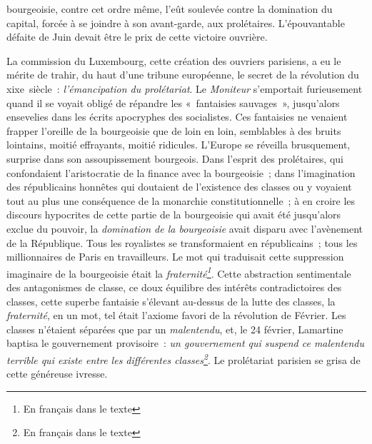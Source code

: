 \documentclass[twoside]{book} %
\begin{document}
bourgeoisie, contre cet ordre même, l’eût soulevée contre la domination du capital, forcée à se joindre à son avant-garde, aux prolétaires. L’épouvantable défaite de Juin devait être le prix de cette victoire ouvrière.\par
La commission du Luxembourg, cette création des ouvriers parisiens, a eu le mérite de trahir, du haut d’une tribune européenne, le secret de la révolution du xixe siècle : \emph{l’émancipation du prolétariat}. Le \emph{Moniteur} s’emportait furieusement quand il se voyait obligé de répandre les « fantaisies sauvages », jusqu’alors ensevelies dans les écrits apocryphes des socialistes. Ces fantaisies ne venaient frapper l’oreille de la bourgeoisie que de loin en loin, semblables à des bruits lointains, moitié effrayants, moitié ridicules. L’Europe se réveilla brusquement, surprise dans son assoupissement bourgeois. Dans l’esprit des prolétaires, qui confondaient l’aristocratie de la finance avec la bourgeoisie ; dans l’imagination des républicains honnêtes qui doutaient de l’existence des classes ou y voyaient tout au plus une conséquence de la monarchie constitutionnelle ; à en croire les discours hypocrites de cette partie de la bourgeoisie qui avait été jusqu’alors exclue du pouvoir, la \emph{domination de la bourgeoisie} avait disparu avec l’avènement de la République. Tous les royalistes se transformaient en républicains ; tous les millionnaires de Paris en travailleurs. Le mot qui traduisait cette suppression imaginaire de la bourgeoisie était la \emph{fraternité\footnote{En français dans le texte}}. Cette abstraction sentimentale des antagonismes de classe, ce doux équilibre des intérêts contradictoires des classes, cette superbe fantaisie s’élevant au-dessus de la lutte des classes, la \emph{fraternité}, en un mot, tel était l’axiome favori de la révolution de Février. Les classes n’étaient séparées que par un \emph{malentendu}, et, le 24 février, Lamartine baptisa le gouvernement provisoire : \emph{un gouvernement qui suspend ce malentendu terrible qui existe entre les différentes classes\footnote{En français dans le texte}}. Le prolétariat parisien se grisa de cette généreuse ivresse.\par
\end{document}

